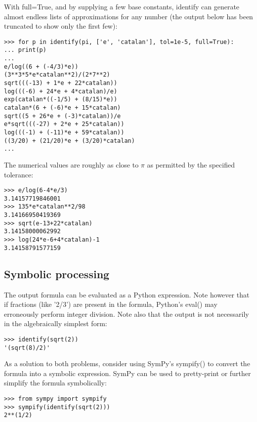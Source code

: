 With full=True, and by supplying a few base constants, identify can generate almost endless lists of approximations for any number (the output below has been truncated to show only the first few):

\begin{lstlisting}
>>> for p in identify(pi, ['e', 'catalan'], tol=1e-5, full=True):
... print(p)
...
e/log((6 + (-4/3)*e))
(3**3*5*e*catalan**2)/(2*7**2)
sqrt(((-13) + 1*e + 22*catalan))
log(((-6) + 24*e + 4*catalan)/e)
exp(catalan*((-1/5) + (8/15)*e))
catalan*(6 + (-6)*e + 15*catalan)
sqrt((5 + 26*e + (-3)*catalan))/e
e*sqrt(((-27) + 2*e + 25*catalan))
log(((-1) + (-11)*e + 59*catalan))
((3/20) + (21/20)*e + (3/20)*catalan)
...
\end{lstlisting}


The numerical values are roughly as close to $\pi$ as permitted by the specified tolerance:

\begin{lstlisting}
>>> e/log(6-4*e/3)
3.14157719846001
>>> 135*e*catalan**2/98
3.14166950419369
>>> sqrt(e-13+22*catalan)
3.14158000062992
>>> log(24*e-6+4*catalan)-1
3.14158791577159
\end{lstlisting}



\subsection{Symbolic processing}

The output formula can be evaluated as a Python expression. Note however that if fractions (like '2/3') are present in the formula, Python's eval() may erroneously perform integer division. Note also that the output is not necessarily in the algebraically simplest
form:

\begin{lstlisting}
>>> identify(sqrt(2))
'(sqrt(8)/2)'
\end{lstlisting}

As a solution to both problems, consider using SymPy's sympify() to convert the formula into a symbolic expression. SymPy can be used to pretty-print or further simplify the formula symbolically:

\begin{lstlisting}
>>> from sympy import sympify
>>> sympify(identify(sqrt(2)))
2**(1/2)
\end{lstlisting}


